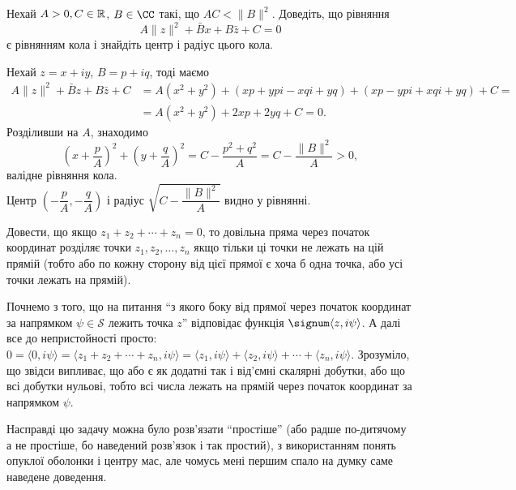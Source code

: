 \begin{problem}[1.22, Евграфов]
    Нехай $A > 0, C \in \mathbb{R}$, $B \in \CC$ такі, що $AC < \|B\|^2$. Доведіть, що рівняння \[ A \|z\|^2 + \bar B x + B \bar z + C = 0\] є рівнянням кола і знайдіть центр і радіус цього кола.
\end{problem}

\begin{solution}
    Нехай $z = x + iy$, $B = p + iq$, тоді маємо 
    \begin{equation*}
    \begin{aligned}
        A \| z \|^2 + \bar B z + B \bar z + C &= A (x^2 + y^2) + (xp + ypi - xqi + yq) + (xp - ypi + xqi + yq) + C = \\
        &= A (x^2 + y^2) + 2 xp + 2yq + C = 0.
    \end{aligned}
    \end{equation*}
    Розділивши на $A$, знаходимо 
    \[ \left( x + \dfrac pA \right)^2 + \left( y + \dfrac qA \right)^2 = C - \dfrac{p^2 + q^2}{A} = C - \dfrac{\|B\|^2}{A} > 0, \]
    валідне рівняння кола.\\
    
    Центр $\left( -\dfrac pA, -\dfrac qA \right)$ і радіус $\sqrt{C - \dfrac{\|B\|^2}{A}}$ видно у рівнянні.
\end{solution}

\begin{problem}[Волковиський, 1.21]
    Довести, що якщо $z_1 + z_2 + \cdots + z_n = 0$, то довільна пряма через початок координат розділяє точки $z_1, z_2, \ldots, z_n$ якщо тільки ці точки не лежать на цій прямій (тобто або по кожну сторону від цієї прямої є хоча б одна точка, або усі точки лежать на прямій).
\end{problem}

\begin{solution}
    Почнемо з того, що на питання  ``з якого боку від прямої через початок координат за напрямком $\psi \in \mathcal{S}$ лежить точка $z$'' відповідає функція $\signum \langle z, i\psi\rangle$. А далі все до непристойності просто: $0 = \langle 0, i \psi \rangle = \langle z_1 + z_2 + \cdots + z_n , i \psi \rangle = \langle z_1, i\psi \rangle + \langle z_2, i\psi \rangle + \cdots + \langle z_n , i \psi \rangle$. Зрозуміло, що звідси випливає, що або є як додатні так і від'ємні скалярні добутки, або що всі добутки нульові, тобто всі числа лежать на прямій через початок координат за напрямком $\psi$.
\end{solution}

\begin{side_comment}
    Насправді цю задачу можна було розв'язати ``простіше'' (або радше по-дитячому а не простіше, бо наведений розв'язок і так простий), з використанням понять опуклої оболонки і центру мас, але чомусь мені першим спало на думку саме наведене доведення.
\end{side_comment}

